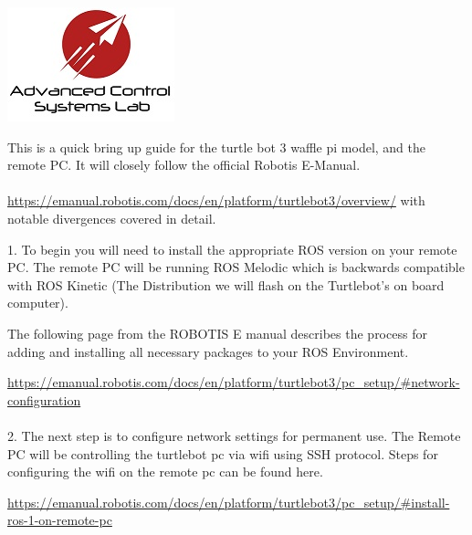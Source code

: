 \documentclass[12]{article}
\begin{document}
\includegraphics[width = \linewidth]{ACSL_logo.jpg}


This is a quick bring up guide for the turtle bot 3 waffle pi model, and the remote PC. It will closely follow the official Robotis E-Manual. \\\\
\url{https://emanual.robotis.com/docs/en/platform/turtlebot3/overview/} 
with notable  divergences covered in detail.







\newpage




1. To begin you will need to install the appropriate ROS version on your remote PC. The remote PC will be running ROS Melodic which is backwards compatible with ROS Kinetic (The Distribution we will flash on the Turtlebot's on board computer).

The following page from the ROBOTIS E manual describes the process for adding and installing all necessary packages to your ROS Environment.

\url {https://emanual.robotis.com/docs/en/platform/turtlebot3/pc_setup/#network-configuration} \\\\

2. The next step is to configure network settings for permanent use. The Remote PC will be controlling the turtlebot pc via wifi using SSH protocol. Steps for configuring the wifi on the remote pc can be found here.

\url {https://emanual.robotis.com/docs/en/platform/turtlebot3/pc_setup/#install-ros-1-on-remote-pc} \\
\end{document}
